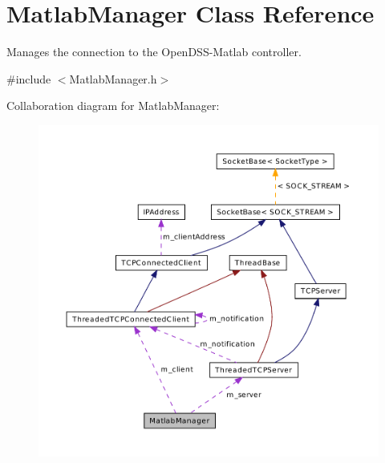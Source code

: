 \hypertarget{class_matlab_manager}{\section{Matlab\-Manager Class Reference}
\label{class_matlab_manager}
}


Manages the connection to the Open\-D\-S\-S-\/\-Matlab controller.  




{\ttfamily \#include $<$Matlab\-Manager.\-h$>$}



Collaboration diagram for Matlab\-Manager\-:\nopagebreak
\begin{figure}[H]
\begin{center}
\leavevmode
\includegraphics[width=350pt]{class_matlab_manager__coll__graph}
\end{center}
\end{figure}
